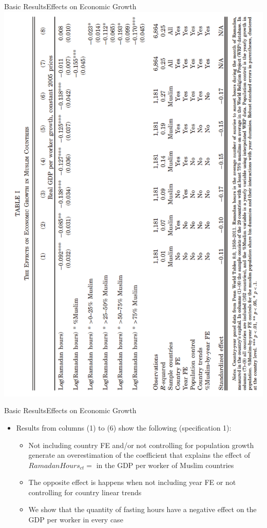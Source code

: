 \documentclass[pdftex,12pt,xcolor=pdftex,table]{beamer}
\begin{document}
    \begin{frame}{Basic Results}{Effects on Economic Growth}
    \vspace{-0.57cm}
    \centering\includegraphics[scale=0.5, angle =270 ]{reg1.png}
    \end{frame}
    
    \begin{frame}{Basic Results}{Effects on Economic Growth}
    \begin{itemize}
        \item Results from columns (1) to (6) show the following (specification 1):
        \begin{itemize}
            \item<2-> Not including country FE and/or not controlling for population growth generate an overestimation of the coefficient that explains the effect of $RamadanHours_{ct}=$ in the GDP per worker of Muslim countries
            \item<3-> The opposite effect is happens when not including year FE or not controlling for country linear trends
            \item<4-> We show that the quantity of fasting hours have a negative effect on the GDP per worker in every case
        \end{itemize}
    \end{itemize}
    \end{frame}
    
\end{document}
